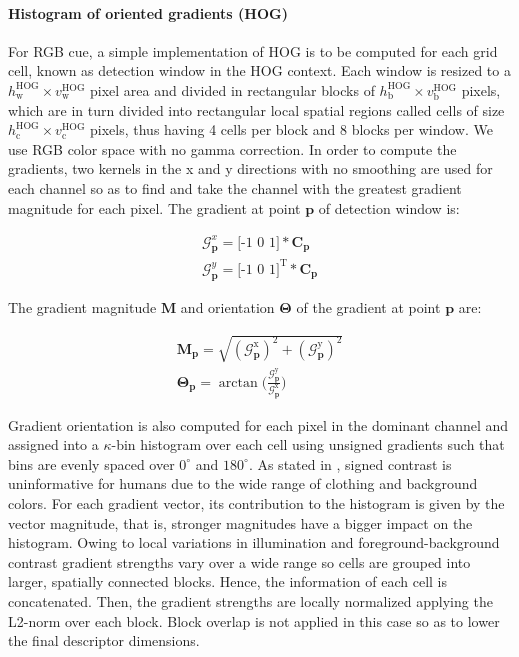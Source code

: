 \documentclass[10pt,twocolumn,letterpaper]{article}
\begin{document}
\paragraph{Histogram of oriented gradients (HOG)}
For RGB cue, a simple implementation of HOG \cite{dalal2005histograms} is to be computed for each grid cell, known as detection window in the HOG context. Each window is resized to a $h_\mathrm{w}^\mathrm{HOG} \times v_\mathrm{w}^\mathrm{HOG}$ pixel area and divided in rectangular blocks of $h_\mathrm{b}^\mathrm{HOG} \times v_\mathrm{b}^\mathrm{HOG}$ pixels, which are in turn divided into rectangular local spatial regions called cells of size $h_\mathrm{c}^\mathrm{HOG} \times v_\mathrm{c}^\mathrm{HOG}$ pixels, thus having 4 cells per block and 8 blocks per window. We use RGB color space with no gamma correction. In order to compute the gradients, two kernels in the x and y directions with no smoothing are used for each channel so as to find and take the channel with the greatest gradient magnitude for each pixel. The gradient at point $\mathbf{p}$ of detection window is:

\begin{gather}
\mathcal{G}_\mathbf{p}^x = \mbox{[-1 0 1]} \ast \mathbf{C}_\mathbf{p} \label{eq:gx} \\[2ex]
\mathcal{G}_\mathbf{p}^y = \mbox{[-1 0 1]}^\mathrm{T} \ast \mathbf{C}_\mathbf{p} \label{eq:gy}
\end{gather}

The gradient magnitude $\mathbf{M}$ and orientation $\mathbf{\Theta}$ of the gradient at point $\mathbf{p}$ are:

\begin{gather}
\mathbf{M}_{\mathbf{p}} = \sqrt{(\mathcal{G}_{\mathbf{p}}^{\mathrm{x}})^2 + (\mathcal{G}_{\mathbf{p}}^{\mathrm{y}})^2} \label{eq:magnitude}\\[2ex]
\mathbf{\Theta}_{\mathbf{p}} = \arctan \Big(\frac{\mathcal{G}_{\mathbf{p}}^{\mathrm{y}}}{\mathcal{G}_{\mathbf{p}}^{\mathrm{x}}}\Big) \label{eq:orientation}
\end{gather}

Gradient orientation is also computed for each pixel in the dominant channel and assigned into a $\kappa$-bin histogram over each cell using unsigned gradients such that bins are evenly spaced over $0^\circ$ and $180^\circ$. As stated in \cite{dalal2005histograms}, signed contrast is uninformative for humans due to the wide range of clothing and background colors. For each gradient vector, its contribution to the histogram is given by the vector magnitude, that is, stronger magnitudes have a bigger impact on the histogram. Owing to local variations in illumination and foreground-background contrast gradient strengths vary over a wide range so cells are grouped into larger, spatially connected blocks. Hence, the information of each cell is concatenated. Then, the gradient strengths are locally normalized applying the L2-norm over each block. Block overlap is not applied in this case so as to lower the final descriptor dimensions. 
\end{document}
